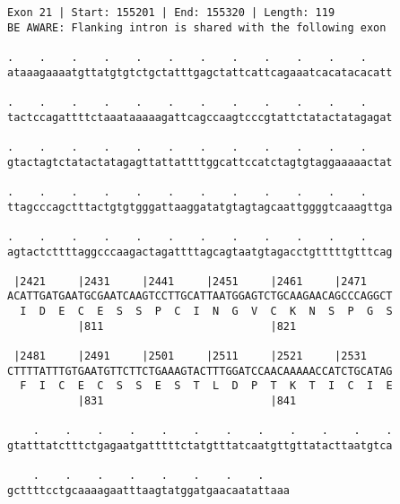 \documentclass{article}
\begin{document}
\begin{Verbatim}[fontfamily=courier]
Exon 21 | Start: 155201 | End: 155320 | Length: 119
BE AWARE: Flanking intron is shared with the following exon

.    .    .    .    .    .    .    .    .    .    .    .    
ataaagaaaatgttatgtgtctgctatttgagctattcattcagaaatcacatacacatt

.    .    .    .    .    .    .    .    .    .    .    .    
tactccagattttctaaataaaaagattcagccaagtcccgtattctatactatagagat

.    .    .    .    .    .    .    .    .    .    .    .    
gtactagtctatactatagagttattattttggcattccatctagtgtaggaaaaactat

.    .    .    .    .    .    .    .    .    .    .    .    
ttagcccagctttactgtgtgggattaaggatatgtagtagcaattggggtcaaagttga

.    .    .    .    .    .    .    .    .    .    .    .    
agtactcttttaggcccaagactagattttagcagtaatgtagacctgtttttgtttcag

 |2421     |2431     |2441     |2451     |2461     |2471    
ACATTGATGAATGCGAATCAAGTCCTTGCATTAATGGAGTCTGCAAGAACAGCCCAGGCT
  I  D  E  C  E  S  S  P  C  I  N  G  V  C  K  N  S  P  G  S
           |811                          |821               

 |2481     |2491     |2501     |2511     |2521     |2531    
CTTTTATTTGTGAATGTTCTTCTGAAAGTACTTTGGATCCAACAAAAACCATCTGCATAG
  F  I  C  E  C  S  S  E  S  T  L  D  P  T  K  T  I  C  I  E
           |831                          |841               

    .    .    .    .    .    .    .    .    .    .    .    .
gtatttatctttctgagaatgatttttctatgtttatcaatgttgttatacttaatgtca

    .    .    .    .    .    .    .    .    
gcttttcctgcaaaagaatttaagtatggatgaacaatattaaa
\end{Verbatim}
\newpage
\end{document}
